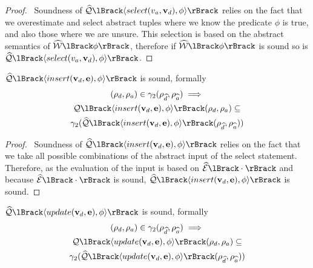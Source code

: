 \begin{proof}
    \pfsketch\
    Soundness of $\abssqlsem{\langle select(v_a, \mathbf{v}_d), \phi \rangle}$ relies on the fact that we overestimate and select abstract tuples where we know the predicate $\phi$ is true, and also those where we are unsure.
    This selection is based on the abstract semantics of $\abspredsem{\phi}$, therefore if $\abspredsem{\phi}$ is sound so is $\abssqlsem{\langle select(v_a, \mathbf{v}_d), \phi \rangle}$.
\end{proof}


\begin{conjecture}
    \label{thm:sound-insert}
    $\abssqlsem{\langle insert(\mathbf{v}_d, \mathbf{e}), \phi \rangle}$ is sound, formally
    \begin{multline*}
    (\rho_d, \rho_a)
        \in \concrete_2(\rho_{\ab{d}}, \rho_{\ab{a}}) \implies \\
        \sqlsem{\langle insert(\mathbf{v}_d, \mathbf{e}), \phi \rangle}(\rho_d, \rho_a) \subseteq \\
        \concrete_2(\abssqlsem{\langle insert(\mathbf{v}_d, \mathbf{e}), \phi \rangle}(\rho_{\ab{d}}, \rho_{\ab{a}}))
    \end{multline*}

\end{conjecture}


\begin{proof}
    \pfsketch\
    Soundness of $\abssqlsem{\langle insert(\mathbf{v}_d, \mathbf{e}), \phi \rangle}$ relies on the fact that we take all possible combinations of the abstract input of the select statement.
    Therefore, as the evaluation of the input is based on $\absexpsem{\cdot}$ and because $\absexpsem{\cdot}$ is sound, $\abssqlsem{\langle insert(\mathbf{v}_d, \mathbf{e}), \phi \rangle}$ is sound.
\end{proof}


\begin{conjecture}
    \label{thm:sound-update}
    $\abssqlsem{\langle update(\absattrs, \absexps), \abspred \rangle}$ is sound, formally
    \begin{multline*}
    (\rho_d, \rho_a)
        \in \concrete_2(\rho_{\ab{d}}, \rho_{\ab{a}}) \implies \\
        \sqlsem{\langle update(\absattrs, \absexps), \abspred \rangle}(\rho_d, \rho_a) \subseteq \\
        \concrete_2(\abssqlsem{\langle update(\absattrs, \absexps), \abspred \rangle}(\rho_{\ab{d}}, \rho_{\ab{a}}))
    \end{multline*}
\end{conjecture}


